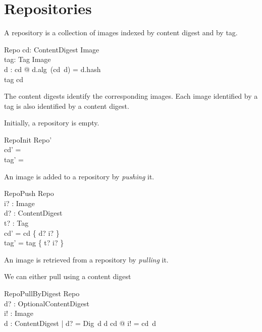 \documentclass[a4paper,twoside,12pt]{article}
\begin{document}
\newpage
\section{Repositories}

A repository is a collection of images indexed by content digest and by tag.
\begin{schema}{Repo}
    cd: ContentDigest \pfun Image \\
    tag: Tag \pfun Image \\
\where
    \forall d : \dom cd @ d.alg~(cd~d) = d.hash \\
    \ran tag \subseteq \ran cd \\
\end{schema}
The content digests identify the corresponding images. Each image identified by a tag is also identified by a content digest.

Initially, a repository is empty.
\begin{schema}{RepoInit}
  Repo' \\
\where
  cd' = \emptyset \\
  tag' = \emptyset \\
\end{schema}
 
 An image is added to a repository by \textit{pushing} it.
\begin{schema}{RepoPush}
  \Delta Repo \\
  i? : Image \\
  d? : ContentDigest \\
  t? : Tag \\
\where
  cd' = cd \oplus \{ d? \mapsto i? \} \\
  tag' = tag \oplus \{ t? \mapsto i? \} \\
\end{schema}

An image is retrieved from a repository by \textit{pulling} it.

We can either pull using a content digest
\begin{schema}{RepoPullByDigest}
  \Xi Repo \\
  d? : OptionalContentDigest \\
  i! : Image \\
\where
  \exists d : ContentDigest | d? = Dig~d  \land d \in \dom cd @ i! = cd~d \\
\end{schema}
\end{document}
